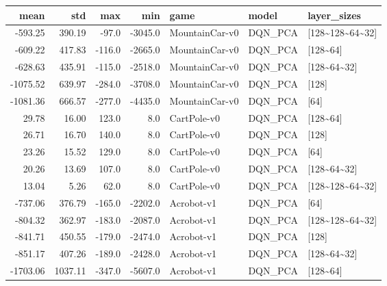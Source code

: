 \begin{tabular}{rrrrlll}
\toprule
    mean &      std &    max &     min &            game &    model &      layer\_sizes \\
\midrule
 -593.25 &   390.19 &  -97.0 & -3045.0 &  MountainCar-v0 &  DQN\_PCA &  [128\textasciitilde128\textasciitilde64\textasciitilde32] \\
 -609.22 &   417.83 & -116.0 & -2665.0 &  MountainCar-v0 &  DQN\_PCA &         [128\textasciitilde64] \\
 -628.63 &   435.91 & -115.0 & -2518.0 &  MountainCar-v0 &  DQN\_PCA &      [128\textasciitilde64\textasciitilde32] \\
-1075.52 &   639.97 & -284.0 & -3708.0 &  MountainCar-v0 &  DQN\_PCA &            [128] \\
-1081.36 &   666.57 & -277.0 & -4435.0 &  MountainCar-v0 &  DQN\_PCA &             [64] \\
   29.78 &    16.00 &  123.0 &     8.0 &     CartPole-v0 &  DQN\_PCA &         [128\textasciitilde64] \\
   26.71 &    16.70 &  140.0 &     8.0 &     CartPole-v0 &  DQN\_PCA &            [128] \\
   23.26 &    15.52 &  129.0 &     8.0 &     CartPole-v0 &  DQN\_PCA &             [64] \\
   20.26 &    13.69 &  107.0 &     8.0 &     CartPole-v0 &  DQN\_PCA &      [128\textasciitilde64\textasciitilde32] \\
   13.04 &     5.26 &   62.0 &     8.0 &     CartPole-v0 &  DQN\_PCA &  [128\textasciitilde128\textasciitilde64\textasciitilde32] \\
 -737.06 &   376.79 & -165.0 & -2202.0 &      Acrobot-v1 &  DQN\_PCA &             [64] \\
 -804.32 &   362.97 & -183.0 & -2087.0 &      Acrobot-v1 &  DQN\_PCA &  [128\textasciitilde128\textasciitilde64\textasciitilde32] \\
 -841.71 &   450.55 & -179.0 & -2474.0 &      Acrobot-v1 &  DQN\_PCA &            [128] \\
 -851.17 &   407.26 & -189.0 & -2428.0 &      Acrobot-v1 &  DQN\_PCA &      [128\textasciitilde64\textasciitilde32] \\
-1703.06 &  1037.11 & -347.0 & -5607.0 &      Acrobot-v1 &  DQN\_PCA &         [128\textasciitilde64] \\
\bottomrule
\end{tabular}
